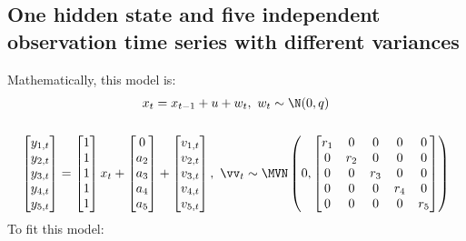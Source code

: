 \subsection{One hidden state and five independent observation time series with different variances}
Mathematically, this model is:
\begin{gather*}
x_{t}= x_{t-1} + u + w_{t}, \text{ } w_t \sim \N(0,q)  \\
\\
\begin{bmatrix}y_{1,t}\\y_{2,t}\\y_{3,t}\\y_{4,t}\\y_{5,t}\end{bmatrix}
= \begin{bmatrix}1\\1\\1\\1\\1\end{bmatrix}
x_{t} + \begin{bmatrix}0\\a_2\\a_3\\a_4\\a_5\end{bmatrix}
+ \begin{bmatrix}v_{1,t}\\ v_{2,t}\\ v_{3,t}\\ v_{4,t}\\ v_{5,t}\end{bmatrix}, 
 \textrm{ } \vv_t \sim \MVN\begin{pmatrix} 0,\begin{bmatrix}r_1&0&0&0&0\\0&r_2&0&0&0\\0&0&r_3&0&0\\0&0&0&r_4&0\\0&0&0&0&r_5\end{bmatrix} \end{pmatrix}  \\
\end{gather*}
To fit this model:  


